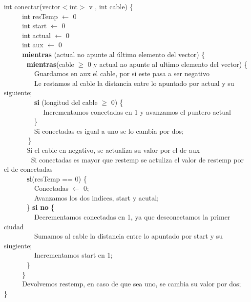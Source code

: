 int conectar(vector$<$int$>$ v , int cable) \{ \\
$~~~~~~~~~~~~$int resTemp $\leftarrow$ 0 \\
$~~~~~~~~~~~~$int start $\leftarrow$ 0 \\
$~~~~~~~~~~~~$int actual $\leftarrow$ 0 \\
$~~~~~~~~~~~~$int aux $\leftarrow$ 0 \\
$~~~~~~~~~~~~$\textbf{mientras} (actual no apunte al último elemento del vector) \{    \\
$~~~~~~~~~~~~~~~$\textbf{mientras}(cable $\geq$ 0 y actual no apunte al ultimo elemento del vector) \{   \\
$~~~~~~~~~~~~~~~~~~~~$Guardamos en aux el cable, por si este pasa a ser negativo \\
$~~~~~~~~~~~~~~~~~~~~$Le restamos al cable la distancia entre lo apuntado por actual y su siguiente; \\
$~~~~~~~~~~~~~~~~~~~~$\textbf{si} (longitud del cable $\geq$ 0) \{  \\
$~~~~~~~~~~~~~~~~~~~~~~~~~~$Incrementamos conectadas en 1 y avanzamos el puntero actual 
$~~~~~~~~~~~~~~~~~~~~$\} \\
$~~~~~~~~~~~~~~~~~~~~$Si conectadas es igual a uno se lo cambia por dos;  \\
$~~~~~~~~~~~~~~~~$\}\\
$~~~~~~~~~~~~~~~$Si el cable en negativo, se actualiza su valor por el de aux\\
$~~~~~~~~~~~~~~~~~~$Si conectadas es mayor que restemp se actuliza el valor de restemp por el de conectadas\\
$~~~~~~~~~~~~~~~$\textbf{si}(resTemp == 0) \{   \\
$~~~~~~~~~~~~~~~~~~~~$Conectadas  $\leftarrow$ 0; \\
$~~~~~~~~~~~~~~~~~~~~$Avanzamos los dos indices, start y acutal;  \\
$~~~~~~~~~~~~~~~$\} \textbf{si no} \{ \\
$~~~~~~~~~~~~~~~~~~~~$Decrementamos conectadas en 1, ya que desconectamos la primer ciudad \\
$~~~~~~~~~~~~~~~~~~~~$Sumamos al cable la distancia entre lo apuntado por start y su siugiente;\\
$~~~~~~~~~~~~~~~~~~~~$Incrementamos start en 1;  \\
$~~~~~~~~~~~~~~~$\} \\
$~~~~~~~~~~~~$\} \\
$~~~~~~~~~~~~$Devolvemos restemp, en caso de que sea uno, se cambia su valor por dos;  \\
\}\\

